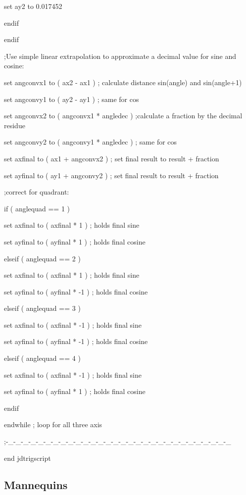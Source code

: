 \documentclass[
]{article}
\begin{document}
set ay2 to 0.017452

endif

endif

;Use simple linear extrapolation to approximate a decimal value for sine
and cosine:

set angconvx1 to ( ax2 - ax1 ) ; calculate distance sin(angle) and
sin(angle+1)

set angconvy1 to ( ay2 - ay1 ) ; same for cos

set angconvx2 to ( angconvx1 * angledec ) ;calculate a fraction by the
decimal residue

set angconvy2 to ( angconvy1 * angledec ) ; same for cos

set axfinal to ( ax1 + angconvx2 ) ; set final result to result +
fraction

set ayfinal to ( ay1 + angconvy2 ) ; set final result to result +
fraction

;correct for quadrant:

if ( anglequad == 1 )

set axfinal to ( axfinal * 1 ) ; holds final sine

set ayfinal to ( ayfinal * 1 ) ; holds final cosine

elseif ( anglequad == 2 )

set axfinal to ( axfinal * 1 ) ; holds final sine

set ayfinal to ( ayfinal * -1 ) ; holds final cosine

elseif ( anglequad == 3 )

set axfinal to ( axfinal * -1 ) ; holds final sine

set ayfinal to ( ayfinal * -1 ) ; holds final cosine

elseif ( anglequad == 4 )

set axfinal to ( axfinal * -1 ) ; holds final sine

set ayfinal to ( ayfinal * 1 ) ; holds final cosine

endif

endwhile ; loop for all three axis

;-\_-\_-\_-\_-\_-\_-\_-\_-\_-\_-\_-\_-\_-\_-\_-\_-\_-\_-\_-\_-\_-\_-\_-\_-\_-\_-\_-\_-\_-\_

end jdtrigscript

\hypertarget{mannequins}{%
\subsection{\texorpdfstring{\hfill\break
Mannequins}{ Mannequins}}\label{mannequins}}
\end{document}
